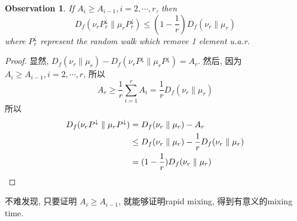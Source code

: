 \documentclass{article}
\newtheorem{observation}{Observation}
\begin{document}
\begin{observation}
  If $A_i \geq A_{i-1}, i = 2, \cdots, r$, then
  \[D_f(\nu_rP_r^{\downarrow}\parallel \mu_rP_r^{\downarrow}) \leq (1 - \frac{1}{r}) D_f(\nu_r\parallel \mu_r)\]
  where $P_r^\downarrow$ represent the random walk which remove 1 element u.a.r.
\end{observation}
\begin{proof}[Proof]
  显然, $D_f(\nu_r \parallel \mu_r) - D_f(\nu_rP^\downarrow \parallel \mu_rP^\downarrow) = A_r$.
  然后, 因为 $A_i\geq A_{i-1}, i = 2,\cdots, r$, 所以
  \[A_r \geq \frac{1}{r} \sum_{i=1}^r A_i = \frac{1}{r} D_f(\nu_r \parallel \mu_r)\]
  所以
  \begin{align*}
    D_f(\nu_rP^\downarrow \parallel \mu_rP^\downarrow)
    &= D_f(\nu_r \parallel \mu_r) - A_r \\
    &\leq D_f(\nu_r \parallel \mu_r) -  \frac{1}{r} D_f(\nu_r \parallel \mu_r)\\
    &= (1 - \frac{1}{r}) D_f(\nu_r \parallel \mu_r) \qedhere
  \end{align*}
\end{proof}

{\flushleft 不难发现, 只要证明 $A_i \geq A_{i-1}$, 就能够证明rapid mixing, 得到有意义的mixing time.}
\end{document}

